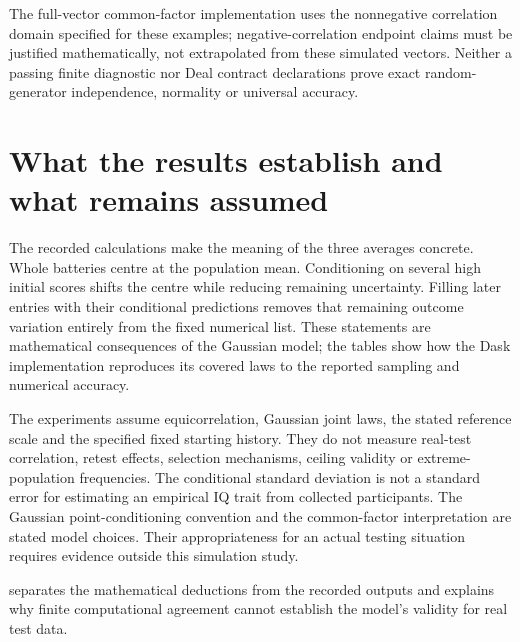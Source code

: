 The full-vector common-factor implementation uses the nonnegative
correlation domain specified for these examples; negative-correlation
endpoint claims must be justified mathematically, not extrapolated
from these simulated vectors. Neither a passing finite diagnostic nor
Deal contract declarations prove exact random-generator independence,
normality or universal accuracy.


\chapter{What the results establish and what remains assumed}
\label{sec:seq-sim-interpretation}

The recorded calculations make the meaning of the three averages
concrete. Whole batteries centre at the population mean. Conditioning on
several high initial scores shifts the centre while reducing remaining
uncertainty. Filling later entries with their conditional predictions
removes that remaining outcome variation entirely from the fixed
numerical list. These statements are mathematical consequences of the
Gaussian model; the tables show how the Dask implementation reproduces
its covered laws to the reported sampling and numerical accuracy.

The experiments assume equicorrelation, Gaussian joint laws, the stated
reference scale and the specified fixed starting history. They do not
measure real-test correlation, retest effects, selection mechanisms,
ceiling validity or extreme-population frequencies. The conditional
standard deviation is not a standard error for estimating an empirical
IQ trait from collected participants. The Gaussian point-conditioning
convention and the common-factor interpretation are stated model choices.
Their appropriateness for an actual testing situation requires evidence
outside this simulation study.

 separates the mathematical deductions
from the recorded outputs and explains why finite computational agreement
cannot establish the model's validity for real test data.








\appendix
\ProjectReportAIAppendix

